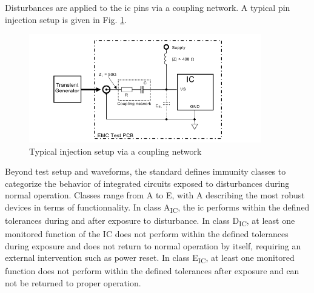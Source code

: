 Disturbances are applied to the \gls{ic} pins via a coupling network.
A typical pin injection setup is given in Fig. \ref{fig:iec62215_setup}.

\begin{figure}[!h]
  \centering
  \includegraphics[width=0.9\textwidth]{src/1/figures/iec62215_setup.png}
  \caption{Typical injection setup via a coupling network}
  \label{fig:iec62215_setup}
\end{figure}

Beyond test setup and waveforms, the standard defines immunity classes to categorize the behavior of integrated circuits exposed to disturbances during normal operation.
Classes range from A to E, with A describing the most robust devices in terms of functionnality.
In class A\textsubscript{IC}, the \gls{ic} performs within the defined tolerances during and after exposure to disturbance.
In class D\textsubscript{IC}, at least one monitored function of the IC does not perform within the defined tolerances during exposure and does not return to normal operation by itself, requiring an external intervention such as power reset.
In class E\textsubscript{IC}, at least one monitored function does not perform within the defined tolerances after exposure and can not be returned to proper operation.
